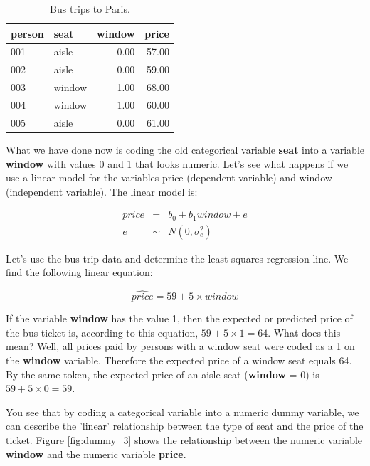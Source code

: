 \documentclass[]{report}\usepackage[]{graphicx}\usepackage[]{color}
\begin{document}
\begin{table}[ht]
\centering
\caption{Bus trips to Paris.} 
\label{tab:dummy_2}
\begin{tabular}{llrr}
  \hline
person & seat & window & price \\ 
  \hline
001 & aisle & 0.00 & 57.00 \\ 
  002 & aisle & 0.00 & 59.00 \\ 
  003 & window & 1.00 & 68.00 \\ 
  004 & window & 1.00 & 60.00 \\ 
  005 & aisle & 0.00 & 61.00 \\ 
   \hline
\end{tabular}
\end{table}


What we have done now is coding the old categorical variable \textbf{seat} into a variable \textbf{window} with values 0 and 1 that looks numeric. Let's see what happens if we use a linear model for the variables price (dependent variable) and window (independent variable). The linear model is:

\begin{eqnarray}
price &=& b_0 + b_1 window + e \\
e &\sim& N(0,\sigma^2_e)
\end{eqnarray}

Let's use the bus trip data and determine the least squares regression line. We find the following linear equation:


\begin{equation}
\widehat{price} = 59 + 5 \times window
\end{equation}

If the variable \textbf{window} has the value 1, then the expected or predicted price of the bus ticket is, according to this equation, $59 + 5\times  1= 64$. What does this mean? Well, all prices paid by persons with a window seat were coded as a 1 on the \textbf{window} variable. Therefore the expected price of a window seat equals 64. By the same token, the expected price of an aisle seat (\textbf{window} = 0) is $59 + 5\times 0= 59$.

You see that by coding a categorical variable into a numeric dummy variable, we can describe the 'linear' relationship between the type of seat and the price of the ticket. Figure \ref{fig:dummy_3} shows the relationship between the numeric variable \textbf{window} and the numeric variable \textbf{price}. 
\end{document}
